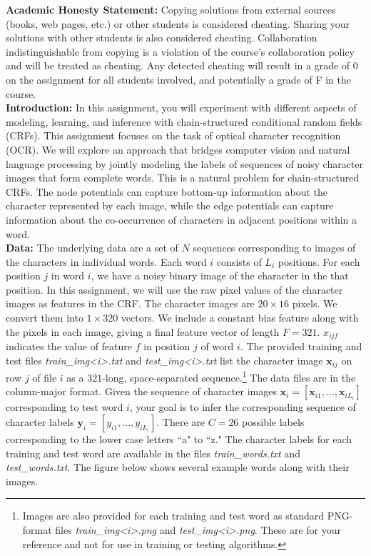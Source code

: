 \documentclass[11pt]{article}
\newcommand{\mbf}[1]{{\mathbf{#1}}}
\begin{document}
\textbf{Academic Honesty Statement:} Copying solutions from external
sources (books, web pages, etc.) or other students is considered
cheating. Sharing your solutions with other students is also
considered cheating. Collaboration indistinguishable from copying is a violation
of the course's collaboration policy and will be treated as cheating.
Any detected cheating will result in a grade of 0
on the assignment for all students involved, and potentially a grade
of F in the course.\\


\textbf{Introduction:} In this assignment, you will experiment with different aspects of modeling, learning, and inference with chain-structured conditional random fields (CRFs). This assignment focuses on the task of
optical character recognition (OCR). We will explore an approach that bridges computer vision and natural language processing by jointly modeling the labels of sequences of noisy character images that form complete words. This is a natural problem for chain-structured CRFs. The node potentials can capture bottom-up information about the character represented by each image, while the edge potentials can capture information about the co-occurrence of characters in adjacent positions within a word.
\\

\textbf{Data: } The underlying data are a set of $N$ sequences corresponding to images of the characters in individual words. Each word $i$ consists of $L_i$ positions. For each position $j$ in word $i$, we have a noisy binary image of the character in the that position. In this assignment, we will use the raw pixel values of the character images as features in the CRF. The character images are $20\times 16$ pixels. We convert them into $1\times 320$ vectors. We include a constant bias feature along with the pixels in each image, giving a final feature vector of
length $F=321$. $x_{ijf}$ indicates the value of feature $f$ in position $j$ of word $i$. The provided training and test files \textit{train\_img<i>.txt} and \textit{test\_img<i>.txt} list the character image $\mbf{x}_{ij}$ on row $j$ of file $i$ as a $321$-long, space-separated sequence.\footnote{Images are also provided for each training and test word as standard PNG-format files \textit{train\_img<i>.png} and \textit{test\_img<i>.png}. These are for your reference and not for use in training or testing algorithms.}
The data files are in the column-major format.
Given the sequence of character images $\mbf{x}_i=[\mbf{x}_{i1},...,\mbf{x}_{iL_i}]$ corresponding to test word $i$, your goal is to infer the corresponding sequence of character labels $\mbf{y}_i=[y_{i1},...,y_{iL_i}]$. There are $C=26$ possible labels corresponding
to the lower case letters ``a" to ``z." The character labels for each training and test word are available in the files \textit{train\_words.txt} and \textit{test\_words.txt}. The figure below shows several example words along with their images.
\end{document}
